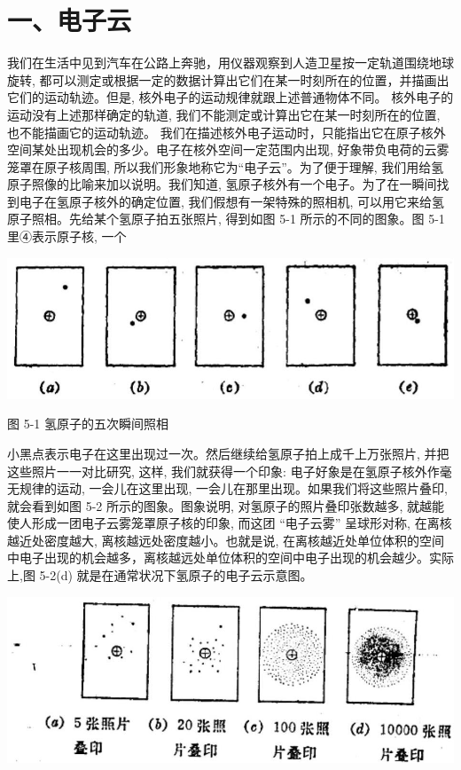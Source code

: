 \documentclass[10pt]{article}
\begin{document}
\section*{一、电子云}

我们在生活中见到汽车在公路上奔驰，用仪器观察到人造卫星按一定轨道围绕地球旋转, 都可以测定或根据一定的数据计算出它们在某一时刻所在的位置，并描画出它们的运动轨迹。但是, 核外电子的运动规律就跟上述普通物体不同。 核外电子的运动没有上述那样确定的轨道, 我们不能测定或计算出它在某一时刻所在的位置, 也不能描画它的运动轨迹。 我们在描述核外电子运动时，只能指出它在原子核外空间某处出现机会的多少。电子在核外空间一定范围内出现, 好象带负电荷的云雾笼罩在原子核周围, 所以我们形象地称它为“电子云”。为了便于理解, 我们用给氢原子照像的比喻来加以说明。我们知道, 氢原子核外有一个电子。为了在一瞬间找到电子在氢原子核外的确定位置, 我们假想有一架特殊的照相机, 可以用它来给氢原子照相。先给某个氢原子拍五张照片, 得到如图 5-1 所示的不同的图象。图 5-1 里④表示原子核, 一个

\begin{center}
\includegraphics[max width=1.0\textwidth]{images/01912d0f-097c-7e75-8f32-4f326cd86c9f_107_547413.jpg}
\end{center}

图 5-1 氢原子的五次瞬间照相

小黑点表示电子在这里出现过一次。然后继续给氢原子拍上成千上万张照片, 并把这些照片一一对比研究, 这样, 我们就获得一个印象: 电子好象是在氢原子核外作毫无规律的运动, 一会儿在这里出现, 一会儿在那里出现。如果我们将这些照片叠印, 就会看到如图 5-2 所示的图象。图象说明, 对氢原子的照片叠印张数越多, 就越能使人形成一团电子云雾笼罩原子核的印象, 而这团 “电子云雾” 呈球形对称, 在离核越近处密度越大, 离核越远处密度越小。也就是说, 在离核越近处单位体积的空间中电子出现的机会越多，离核越远处单位体积的空间中电子出现的机会越少。实际上,图 5-2(d) 就是在通常状况下氢原子的电子云示意图。

\begin{center}
\includegraphics[max width=1.0\textwidth]{images/01912d0f-097c-7e75-8f32-4f326cd86c9f_108_831895.jpg}
\end{center}
\end{document}
